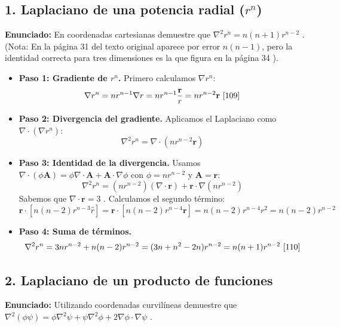 \documentclass[a4paper]{article}
\begin{document}
\subsection*{1. Laplaciano de una potencia radial ($r^n$)}
\textbf{Enunciado:} En coordenadas cartesianas demuestre que $\nabla^2 r^n = n(n+1)r^{n-2}$ \cite{110}. (Nota: En la página 31 del texto original \cite{103} aparece por error $n(n-1)$, pero la identidad correcta para tres dimensiones es la que figura en la página 34 \cite{110}).

\begin{itemize}
    \item \textbf{Paso 1: Gradiente de $r^n$.} Primero calculamos $\nabla r^n$:
    \begin{equation*}
        \nabla r^n = n r^{n-1} \nabla r = n r^{n-1} \frac{\mathbf{r}}{r} = n r^{n-2} \mathbf{r} \text{ \cite{109}}
    \end{equation*}
    \item \textbf{Paso 2: Divergencia del gradiente.} Aplicamos el Laplaciano como $\nabla \cdot (\nabla r^n)$:
    \begin{equation*}
        \nabla^2 r^n = \nabla \cdot (n r^{n-2} \mathbf{r})
    \end{equation*}
    \item \textbf{Paso 3: Identidad de la divergencia.} Usamos $\nabla \cdot (\phi \mathbf{A}) = \phi \nabla \cdot \mathbf{A} + \mathbf{A} \cdot \nabla \phi$ con $\phi = n r^{n-2}$ y $\mathbf{A} = \mathbf{r}$:
    \begin{equation*}
        \nabla^2 r^n = (n r^{n-2})(\nabla \cdot \mathbf{r}) + \mathbf{r} \cdot \nabla(n r^{n-2})
    \end{equation*}
    Sabemos que $\nabla \cdot \mathbf{r} = 3$ \cite{109}. Calculamos el segundo término:
    \begin{equation*}
        \mathbf{r} \cdot [n(n-2)r^{n-3} \hat{r}] = \mathbf{r} \cdot [n(n-2)r^{n-4} \mathbf{r}] = n(n-2)r^{n-4} r^2 = n(n-2)r^{n-2}
    \end{equation*}
    \item \textbf{Paso 4: Suma de términos.}
    \begin{equation*}
        \nabla^2 r^n = 3n r^{n-2} + n(n-2)r^{n-2} = (3n + n^2 - 2n)r^{n-2} = n(n+1)r^{n-2} \text{ \cite{110}}
    \end{equation*}
\end{itemize}

\subsection*{2. Laplaciano de un producto de funciones}
\textbf{Enunciado:} Utilizando coordenadas curvilíneas demuestre que $\nabla^2 (\phi \psi) = \phi \nabla^2 \psi + \psi \nabla^2 \phi + 2 \nabla \phi \cdot \nabla \psi$ \cite{103}.
\end{document}

